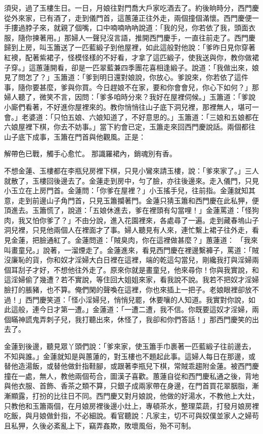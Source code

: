 須臾，過了玉樓生日。一日，月娘往對門喬大戶家吃酒去了。約後晌時分，西門慶從外來家，已有酒了，走到儀門首，這蕙蓮正往外走，兩個撞個滿懷。西門慶便一手摟過脖子來，就親了個嘴，口中喃喃吶吶說道：「我的兒，你若依了我，頭面衣服，隨你揀著用。」那婦人一聲兒沒言語，推開西門慶手，一直往前走了。西門慶歸到上房，叫玉簫送了一匹藍緞子到他屋裡，如此這般對他說：「爹昨日見你穿著紅襖，配著紫裙子，怪模怪樣的不好看，才拿了這匹緞子，使我送與你，教你做裙子穿。」這蕙蓮開看，卻是一匹翠藍兼四季團花喜相逢緞子。說道：「我做出來，娘見了問怎了？」玉簫道：「爹到明日還對娘說，你放心。爹說來，你若依了這件事，隨你要甚麼，爹與你買。今日趕娘不在家，要和你會會兒，你心下如何？」那婦人聽了，微笑不言，因問：「爹多咱時分來？我好在屋裡伺候。」玉簫道：「爹說小廝們看著，不好進你屋裡來的。教你悄悄往山子底下洞兒裡，那裡無人，堪可一會。」老婆道：「只怕五娘、六娘知道了，不好意思的。」玉簫道：「三娘和五娘都在六娘屋裡下棋，你去不妨事。」當下約會已定，玉簫走來回西門慶說話。兩個都往山子底下成事，玉簫在門首與他觀風。正是：

解帶色已戰，觸手心愈忙。
那識羅裙內，銷魂別有香。

不想金蓮、玉樓都在李瓶兒房裡下棋，只見小鸞來請玉樓，說：「爹來家了。」三人就散了，玉樓回後邊去了。金蓮走到房中，勻了臉，亦往後邊來。走入儀門，只見小玉立在上房門首。金蓮問：「你爹在屋裡？」小玉搖手兒，往前指。金蓮就知其意，走到前邊山子角門首，只見玉簫攔著門。金蓮只猜玉簫和西門慶在此私狎，便頂進去。玉簫慌了，說道：「五娘休進去，爹在裡頭有勾當哩！」金蓮罵道：「怪狗肉，我又怕你爹了？」不由分說，進入花園裡來，各處尋了一遍。走到藏春塢山子洞兒裡，只見他兩個人在裡面才了事。婦人聽見有人來，連忙繫上裙子往外走，看見金蓮，把臉通紅了。金蓮問道：「賊臭肉，你在這裡做甚麼？」蕙蓮道： 「我來叫畫童兒。」說著，一溜煙走了。金蓮進來，看見西門慶在裡邊繫褲子，罵道：「賊沒廉恥的貨，你和奴才淫婦大白日裡在這裡，端的乾這勾當兒，剛纔我打與淫婦兩個耳刮子才好，不想他往外走了。原來你就是畫童兒，他來尋你！你與我實說，和這淫婦偷了幾遭？若不實說，等住回大姐姐來家，看我說不說。我若不把奴才淫婦臉打的脹豬，也不算。俺們閑的聲喚在這裡，你也來插上一把子。老娘眼裡卻放不過！」西門慶笑道：「怪小淫婦兒，悄悄兒罷，休要嚷的人知道。我實對你說，如此這般，連今日才第一遭。」金蓮道：「一遭二遭，我不信。你既要這奴才淫婦，兩個瞞神謊鬼弄刺子兒，我打聽出來，休怪了，我卻和你們答話！」那西門慶笑的出去了。

金蓮到後邊，聽見眾丫頭們說：「爹來家，使玉簫手巾裹著一匹藍緞子往前邊去，不知與誰。」金蓮就知是與蕙蓮的，對玉樓也不題起此事。這婦人每日在那邊，或替他造湯飯，或替他做針指鞋腳，或跟著李瓶兒下棋，常賊乖趨附金蓮。被西門慶撞在一處，無人，教他兩個苟合，圖漢子喜歡。蕙蓮自從和西門慶私通之後，背地與他衣服、首飾、香茶之類不算，只銀子成兩家帶在身邊，在門首買花翠胭脂，漸漸顯露，打扮的比往日不同。西門慶又對月娘說，他做的好湯水，不教他上大灶，只教他和玉簫兩個，在月娘房裡後邊小灶上，專頓茶水，整理菜蔬，打發月娘房裡吃飯，與月娘做針指，不必細說。看官聽說：凡家主，切不可與奴僕並家人之婦苟且私狎，久後必紊亂上下，竊弄姦欺，敗壞風俗，殆不可制。

